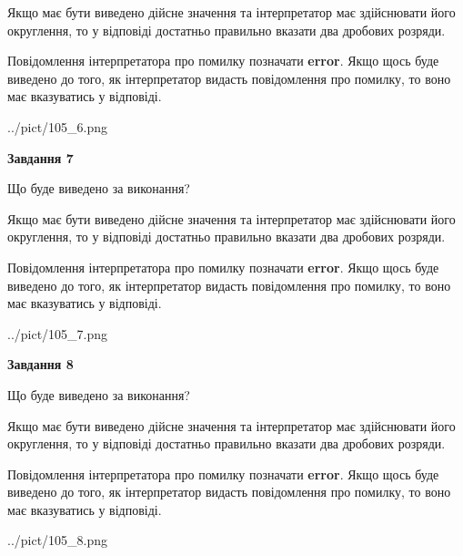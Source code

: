 \documentclass[12pt, ukrainian]{article}
\begin{document}
{\begin {Large}
Якщо має бути виведено дійсне значення та інтерпретатор має здійснювати його округлення, 
то у відповіді достатньо правильно вказати два дробових розряди.

Повідомлення інтерпретатора про помилку позначати \textbf{error}.
Якщо щось буде виведено до того, як інтерпретатор видасть повідомлення про помилку, 
то воно має вказуватись у відповіді. \par

\begin{center}
	{../pict/105_6.png}
\end{center}
\newpage

{\begin {center}\textbf{Завдання 7}\end {center}}\par
Що буде виведено за виконання? \par

Якщо має бути виведено дійсне значення та інтерпретатор має здійснювати його округлення, 
то у відповіді достатньо правильно вказати два дробових розряди.

Повідомлення інтерпретатора про помилку позначати \textbf{error}.
Якщо щось буде виведено до того, як інтерпретатор видасть повідомлення про помилку, 
то воно має вказуватись у відповіді. \par

\begin{center}
	{../pict/105_7.png}
\end{center}
\newpage

{\begin {center}\textbf{Завдання 8}\end {center}}\par
Що буде виведено за виконання? \par

Якщо має бути виведено дійсне значення та інтерпретатор має здійснювати його округлення, 
то у відповіді достатньо правильно вказати два дробових розряди.

Повідомлення інтерпретатора про помилку позначати \textbf{error}.
Якщо щось буде виведено до того, як інтерпретатор видасть повідомлення про помилку, 
то воно має вказуватись у відповіді. \par

\begin{center}
	{../pict/105_8.png}
\end{center}
\newpage


\end{Large}}
\end{document}
